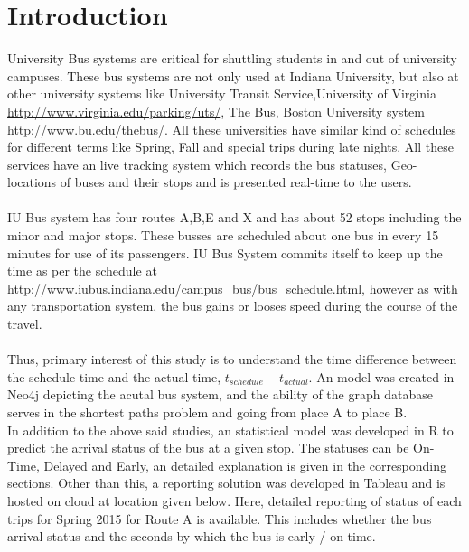 \documentclass[12pt]{article}
\begin{document}
\section{Introduction}
University Bus systems are critical for shuttling students in and out of university campuses. These bus systems are not only used at Indiana University, but also at other university systems like University Transit Service,University of Virginia \url{http://www.virginia.edu/parking/uts/}, The Bus, Boston University system \url{http://www.bu.edu/thebus/}. All these universities have similar kind of schedules for different terms like Spring, Fall and special trips during late nights. All these services have an live tracking system which records the bus statuses, Geo-locations of buses and their stops and is presented real-time to the users.\\ \\
IU Bus system has four routes A,B,E and X and has about 52 stops including the minor and major stops. These busses are scheduled about one bus in every 15 minutes for use of its passengers. IU Bus System commits itself to keep up the time as per the schedule at \url{http://www.iubus.indiana.edu/campus_bus/bus_schedule.html}, however as with any transportation system, the bus gains or looses speed during the course of the travel. \\ \\
Thus, primary interest of this study is to understand the time difference between the schedule time and the actual time, $t_{schedule} - t_{actual}$. An model was created in Neo4j depicting the acutal bus system, and the ability of the graph database serves in the shortest paths problem and going from place A to place B. \\
In addition to the above said studies, an statistical model was developed in R to predict the arrival status of the bus at a given stop. The statuses can be On-Time, Delayed and Early, an detailed explanation is given in the corresponding sections. Other than this, a reporting solution was developed in Tableau and is hosted on cloud at location given below. Here, detailed reporting of status of each trips for Spring 2015 for Route A is available. This includes whether the bus arrival status and the seconds by which the bus is early / on-time. \\
\end{document}
